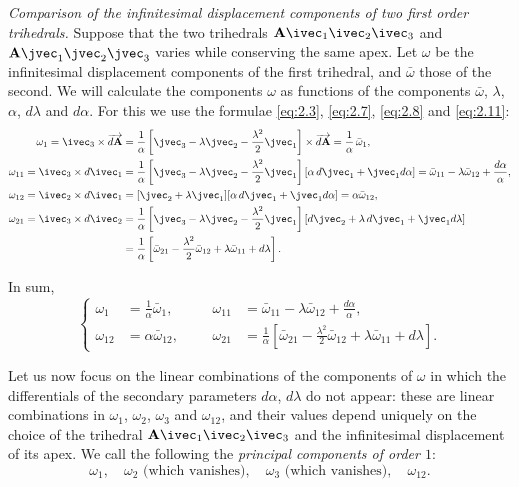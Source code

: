\emph{Comparison of the infinitesimal displacement components of two first order trihedrals.} Suppose that the two trihedrals $\mathbf{A}\ivec_{1}\ivec_{2}\ivec_{3}$ and $\mathbf{A}\jvec_{1}\jvec_{2}\jvec_{3}$ varies while conserving the same apex. Let $\omega$ be the infinitesimal displacement components of the first trihedral, and $\bar\omega$ those of the second. We will calculate the components $\omega$ as functions of the components $\bar\omega$, $\lambda$, $\alpha$, $d\lambda$ and $d\alpha$. For this we use the formulae \eqref{eq:2.3}, \eqref{eq:2.7}, \eqref{eq:2.8} and \eqref{eq:2.11}:
\begin{align*}
  \omega_{1}=\ivec_{3}\times\overrightarrow{d\mathbf{A}}&=\frac{1}{\alpha}\left[\jvec_{3}-\lambda\jvec_{2}-\frac{\lambda^{2}}{2}\jvec_{1}\right]\times\overrightarrow{d\mathbf{A}}=\frac{1}{\alpha}\,\bar\omega_{1},\\
  \omega_{11}=\ivec_{3}\times{d\ivec_{1}}&=\frac{1}{\alpha}\left[\jvec_{3}-\lambda\jvec_{2}-\frac{\lambda^{2}}{2}\jvec_{1}\right][\alpha\,{d\jvec_{1}}+\jvec_{1}d\alpha]=\bar\omega_{11}-\lambda\bar\omega_{12}+\frac{d\alpha}{\alpha},\\
  \omega_{12}=\ivec_{2}\times{d\ivec_{1}}&=[\jvec_{2}+\lambda\jvec_{1}][\alpha\,d\jvec_{1}+\jvec_{1}d\alpha]=\alpha\bar\omega_{12},\\
  \omega_{21}=\ivec_{3}\times{d\ivec_{2}}&=\frac{1}{\alpha}\left[\jvec_{3}-\lambda\jvec_{2}-\frac{\lambda^{2}}{2}\jvec_{1}\right][d\jvec_{2}+\lambda\,d\jvec_{1}+\jvec_{1}d\lambda]\\
  &=\frac{1}{\alpha}\left[\bar\omega_{21}-\frac{\lambda^{2}}{2}\bar\omega_{12}+\lambda\bar\omega_{11}+d\lambda\right].
\end{align*}

In sum,
\begin{equation}
  \label{eq:2.12}
  \left\{
    \begin{aligned}
      \omega_{1}&=\frac{1}{\alpha}\bar\omega_{1},&&&\omega_{11}&=\bar\omega_{11}-\lambda\bar\omega_{12}+\frac{d\alpha}{\alpha},\\
      \omega_{12}&=\alpha\bar\omega_{12},&&&\omega_{21}&=\frac{1}{\alpha}\left[\bar\omega_{21}-\frac{\lambda^{2}}{2}\bar\omega_{12}+\lambda\bar\omega_{11}+d\lambda\right].
    \end{aligned}
  \right.
\end{equation}

Let us now focus on the linear combinations of the components of $\omega$ in which the differentials of the secondary parameters $d\alpha$, $d\lambda$ do not appear: these are linear combinations in $\omega_{1}$, $\omega_{2}$, $\omega_{3}$ and $\omega_{12}$, and their values depend uniquely on the choice of the trihedral $\mathbf{A}\ivec_{1}\ivec_{2}\ivec_{3}$ and the infinitesimal displacement of its apex. We call the following the \emph{principal components of order $1$}:
\[
\boxed{
\omega_{1},\quad\omega_{2}\text{ (which vanishes)},\quad\omega_{3}\text{ (which vanishes)},\quad\omega_{12}.
}
\]
\somespace

